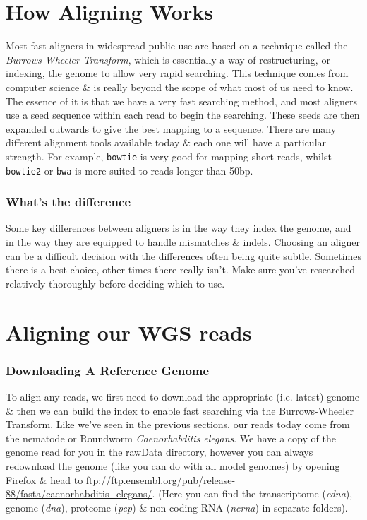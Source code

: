 \section{How Aligning Works}
\begin{note}
Most fast aligners in widespread public use are based on a technique called the \textit{Burrows-Wheeler Transform}, which is essentially a way of restructuring, or indexing, the genome to allow very rapid searching.
This technique comes from computer science \& is really beyond the scope of what most of us need to know.
The essence of it is that we have a very fast searching method, and most aligners use a seed sequence within each read to begin the searching.
These seeds are then expanded outwards to give the best mapping to a sequence.
There are many different alignment tools available today \& each one will have a particular strength.
For example, \texttt{bowtie} is very good for mapping short reads, whilst \texttt{bowtie2} or \texttt{bwa} is more suited to reads longer than 50bp.
\end{note}

\subsubsection{What's the difference}
Some key differences between aligners is in the way they index the genome, and in the way they are equipped to handle mismatches \& indels.
Choosing an aligner can be a difficult decision with the differences often being quite subtle.
Sometimes there is a best choice, other times there really isn't.
Make sure you've researched relatively thoroughly before deciding which to use.

\section{Aligning our WGS reads}
\subsubsection{Downloading A Reference Genome}
To align any reads, we first need to download the appropriate (i.e. latest) genome \& then we can build the index to enable fast searching via the Burrows-Wheeler Transform.
Like we've seen in the previous sections, our reads today come from the nematode or Roundworm \textit{Caenorhabditis elegans}. We have a copy of the genome read for you in the rawData directory, however you can always redownload the genome (like you can do with all model genomes) by opening Firefox \& head to \url{ftp://ftp.ensembl.org/pub/release-88/fasta/caenorhabditis_elegans/}.
(Here you can find the transcriptome (\textit{cdna}), genome (\textit{dna}), proteome (\textit{pep}) \& non-coding RNA (\textit{ncrna}) in separate folders).

